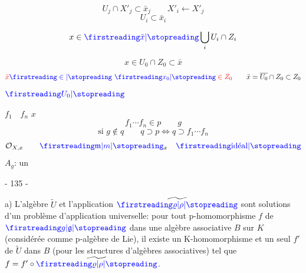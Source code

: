 
\[
U_j\cap X'_j\subset\bar x_j\qquad X'_i\longleftarrow X'_j
\]
\[
U_i\subset\bar x_i
\]

\[
x\in\deleted{\unsure{\bar x}}\bigcup_i U_i\cap Z_i
\]

\[
x\in U_0\cap Z_0\subset\bar x
\]
\[
\deleted{\bar x\unsure{\in}\ \unsure{x_0}\in Z_0}\qquad
\bar x=\overline{U_0}\cap Z_0\subset Z_0
\]
$\unsure{U_0}$

$f_1\quad f_n$  $x$
\[
f_1\cdots f_n\in p\qquad g
\]
\[
\text{si }g\notin q\qquad q\supset p\Longleftrightarrow q\supset f_1\cdots f_n
\]
\[
\mathcal O_{X,x}\qquad \unsure{\mathfrak m|m}_x\quad\deleted{\text{\unsure{idéal}}}
\]
$A_g$: un 


\begin{center}- 135 -\end{center}

a) L'algèbre $\widetilde U$ et l'application $\widetilde{\unsure{\varrho|\rho}}$ sont solutions d'un problème d'application universelle: pour tout p-homomorphisme $f$ de $\unsure{g|\mathfrak g}$ dans une algèbre associative $B$ sur $K$ (considérée comme p-algèbre de Lie), il existe un K-homomorphisme et un seul $f'$ de $\widetilde U$ dans $B$ (pour les structures d'algèbres associatives) tel que $f=f'\circ\widetilde{\unsure{\varrho|\rho}}$.

